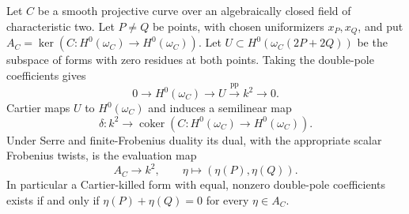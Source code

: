 \begin{lemma}
\label{lem:ss-two-point-Cartier}
Let $C$ be a smooth projective curve over an algebraically closed field
of characteristic two. Let $P\ne Q$ be points, with chosen uniformizers
$x_P,x_Q$, and put $A_C=\ker(C:H^0(\omega_C)\to H^0(\omega_C))$.
Let $U\subset H^0(\omega_C(2P+2Q))$ be the subspace of forms with
zero residues at both points. Taking the double-pole coefficients gives
\[
 0\longrightarrow H^0(\omega_C)\longrightarrow U
   \xrightarrow{\mathrm{pp}}k^2\longrightarrow0.
\]
Cartier maps $U$ to $H^0(\omega_C)$ and induces a semilinear map
\[
 \delta:k^2\longrightarrow\operatorname{coker}
       (C:H^0(\omega_C)\to H^0(\omega_C)).
\]
Under Serre and finite-Frobenius duality its dual, with the appropriate
scalar Frobenius twists, is the evaluation map
\[
          A_C\longrightarrow k^2,
          \qquad\eta\longmapsto(\eta(P),\eta(Q)).
\]
In particular a Cartier-killed form with equal, nonzero double-pole
coefficients exists if and only if
$\eta(P)+\eta(Q)=0$ for every $\eta\in A_C$.
\end{lemma}
